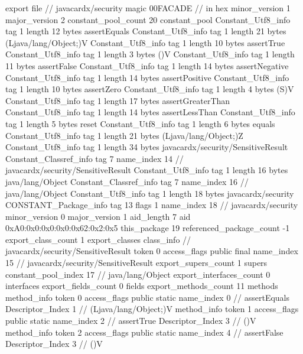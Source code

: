 export file {		// javacardx/security
	magic	00FACADE		 // in hex
	minor_version	1
	major_version	2
	constant_pool_count	20
	constant_pool {
		Constant_Utf8_info {
			tag	1
			length	12
			bytes	assertEquals
		}
		Constant_Utf8_info {
			tag	1
			length	21
			bytes	(Ljava/lang/Object;)V
		}
		Constant_Utf8_info {
			tag	1
			length	10
			bytes	assertTrue
		}
		Constant_Utf8_info {
			tag	1
			length	3
			bytes	()V
		}
		Constant_Utf8_info {
			tag	1
			length	11
			bytes	assertFalse
		}
		Constant_Utf8_info {
			tag	1
			length	14
			bytes	assertNegative
		}
		Constant_Utf8_info {
			tag	1
			length	14
			bytes	assertPositive
		}
		Constant_Utf8_info {
			tag	1
			length	10
			bytes	assertZero
		}
		Constant_Utf8_info {
			tag	1
			length	4
			bytes	(S)V
		}
		Constant_Utf8_info {
			tag	1
			length	17
			bytes	assertGreaterThan
		}
		Constant_Utf8_info {
			tag	1
			length	14
			bytes	assertLessThan
		}
		Constant_Utf8_info {
			tag	1
			length	5
			bytes	reset
		}
		Constant_Utf8_info {
			tag	1
			length	6
			bytes	equals
		}
		Constant_Utf8_info {
			tag	1
			length	21
			bytes	(Ljava/lang/Object;)Z
		}
		Constant_Utf8_info {
			tag	1
			length	34
			bytes	javacardx/security/SensitiveResult
		}
		Constant_Classref_info {
			tag	7
			name_index	14		// javacardx/security/SensitiveResult
		}
		Constant_Utf8_info {
			tag	1
			length	16
			bytes	java/lang/Object
		}
		Constant_Classref_info {
			tag	7
			name_index	16		// java/lang/Object
		}
		Constant_Utf8_info {
			tag	1
			length	18
			bytes	javacardx/security
		}
		CONSTANT_Package_info {
			tag	13
			flags	1
			name_index	18		// javacardx/security
			minor_version	0
			major_version	1
			aid_length	7
			aid	0xA0:0x0:0x0:0x0:0x62:0x2:0x5
		}
	}
	this_package	19
	referenced_package_count	-1
	export_class_count	1
	export_classes {
		class_info {		// javacardx/security/SensitiveResult
			token	0
			access_flags	public final
			name_index	15		// javacardx/security/SensitiveResult
			export_supers_count	1
			supers {
				constant_pool_index	17		// java/lang/Object
			}
			export_interfaces_count	0
			interfaces {
			}
			export_fields_count	0
			fields {
			}
			export_methods_count	11
			methods {
				method_info {
					token	0
					access_flags	public static
					name_index	0		// assertEquals
					Descriptor_Index	1		// (Ljava/lang/Object;)V
				}
				method_info {
					token	1
					access_flags	public static
					name_index	2		// assertTrue
					Descriptor_Index	3		// ()V
				}
				method_info {
					token	2
					access_flags	public static
					name_index	4		// assertFalse
					Descriptor_Index	3		// ()V
}}}}}
